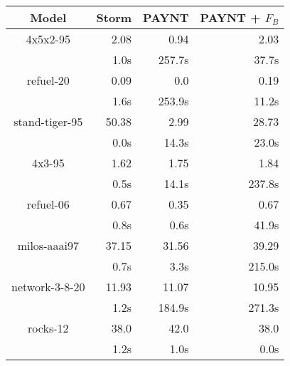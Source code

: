 \documentclass{article}
\begin{document}
\begin{table}
\begin{tabular}{|c|r|r|r|}
\hline

Model & Storm & PAYNT & PAYNT + $F_{B}$ \\ \hline 

4x5x2-95 & 2.08 & 0.94 & 2.03 \\ 
 & 1.0s & 257.7s & 37.7s \\ 
\hline
refuel-20 & 0.09 & 0.0 & 0.19 \\ 
 & 1.6s & 253.9s & 11.2s \\ 
\hline
stand-tiger-95 & 50.38 & 2.99 & 28.73 \\ 
 & 0.0s & 14.3s & 23.0s \\ 
\hline
4x3-95 & 1.62 & 1.75 & 1.84 \\ 
 & 0.5s & 14.1s & 237.8s \\ 
\hline
refuel-06 & 0.67 & 0.35 & 0.67 \\ 
 & 0.8s & 0.6s & 41.9s \\ 
\hline
milos-aaai97 & 37.15 & 31.56 & 39.29 \\ 
 & 0.7s & 3.3s & 215.0s \\ 
\hline
network-3-8-20 & 11.93 & 11.07 & 10.95 \\ 
 & 1.2s & 184.9s & 271.3s \\ 
\hline
rocks-12 & 38.0 & 42.0 & 38.0 \\ 
 & 1.2s & 1.0s & 0.0s \\ 
\hline

\end{tabular}
\end{table}
\end{document}

